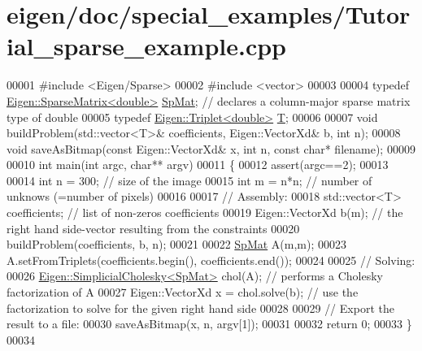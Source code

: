 \hypertarget{eigen_2doc_2special__examples_2_tutorial__sparse__example_8cpp_source}{}\section{eigen/doc/special\+\_\+examples/\+Tutorial\+\_\+sparse\+\_\+example.cpp}
\label{eigen_2doc_2special__examples_2_tutorial__sparse__example_8cpp_source}

\begin{DoxyCode}
00001 \textcolor{preprocessor}{#include <Eigen/Sparse>}
00002 \textcolor{preprocessor}{#include <vector>}
00003 
00004 \textcolor{keyword}{typedef} \hyperlink{group___sparse_core___module}{Eigen::SparseMatrix<double>} \hyperlink{group___sparse_core___module}{SpMat}; \textcolor{comment}{// declares a column-major
       sparse matrix type of double}
00005 \textcolor{keyword}{typedef} \hyperlink{group___sparse_core___module}{Eigen::Triplet<double>} \hyperlink{group___sparse_core___module_class_eigen_1_1_triplet}{T};
00006 
00007 \textcolor{keywordtype}{void} buildProblem(std::vector<T>& coefficients, Eigen::VectorXd& b, \textcolor{keywordtype}{int} n);
00008 \textcolor{keywordtype}{void} saveAsBitmap(\textcolor{keyword}{const} Eigen::VectorXd& x, \textcolor{keywordtype}{int} n, \textcolor{keyword}{const} \textcolor{keywordtype}{char}* filename);
00009 
00010 \textcolor{keywordtype}{int} main(\textcolor{keywordtype}{int} argc, \textcolor{keywordtype}{char}** argv)
00011 \{
00012   assert(argc==2);
00013   
00014   \textcolor{keywordtype}{int} n = 300;  \textcolor{comment}{// size of the image}
00015   \textcolor{keywordtype}{int} m = n*n;  \textcolor{comment}{// number of unknows (=number of pixels)}
00016 
00017   \textcolor{comment}{// Assembly:}
00018   std::vector<T> coefficients;            \textcolor{comment}{// list of non-zeros coefficients}
00019   Eigen::VectorXd b(m);                   \textcolor{comment}{// the right hand side-vector resulting from the constraints}
00020   buildProblem(coefficients, b, n);
00021 
00022   \hyperlink{group___sparse_core___module}{SpMat} A(m,m);
00023   A.setFromTriplets(coefficients.begin(), coefficients.end());
00024 
00025   \textcolor{comment}{// Solving:}
00026   \hyperlink{group___sparse_cholesky___module_class_eigen_1_1_simplicial_cholesky}{Eigen::SimplicialCholesky<SpMat>} chol(A);  \textcolor{comment}{// performs a Cholesky
       factorization of A}
00027   Eigen::VectorXd x = chol.solve(b);         \textcolor{comment}{// use the factorization to solve for the given right hand
       side}
00028 
00029   \textcolor{comment}{// Export the result to a file:}
00030   saveAsBitmap(x, n, argv[1]);
00031 
00032   \textcolor{keywordflow}{return} 0;
00033 \}
00034 
\end{DoxyCode}
